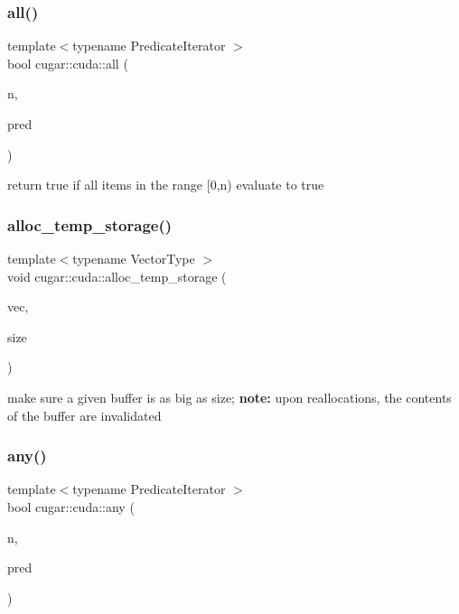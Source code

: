 \subsubsection{\texorpdfstring{all()}{all()}}
{\footnotesize\ttfamily template$<$typename Predicate\+Iterator $>$ \\
bool cugar\+::cuda\+::all (\begin{DoxyParamCaption}\item[{const uint32}]{n,  }\item[{const Predicate\+Iterator}]{pred }\end{DoxyParamCaption})}

return true if all items in the range \mbox{[}0,n) evaluate to true \mbox{\label{group___c_u_d_a_primitives_gafdf4fa3f9edffaa78aefde67918ff47a}} 
\subsubsection{\texorpdfstring{alloc\+\_\+temp\+\_\+storage()}{alloc\_temp\_storage()}}
{\footnotesize\ttfamily template$<$typename Vector\+Type $>$ \\
void cugar\+::cuda\+::alloc\+\_\+temp\+\_\+storage (\begin{DoxyParamCaption}\item[{Vector\+Type \&}]{vec,  }\item[{const uint64}]{size }\end{DoxyParamCaption})}

make sure a given buffer is as big as size; {\bfseries note\+:} upon reallocations, the contents of the buffer are invalidated \mbox{\label{group___c_u_d_a_primitives_ga398b5731f714f21b3161db7aaa34eda2}} 
\subsubsection{\texorpdfstring{any()}{any()}}
{\footnotesize\ttfamily template$<$typename Predicate\+Iterator $>$ \\
bool cugar\+::cuda\+::any (\begin{DoxyParamCaption}\item[{const uint32}]{n,  }\item[{const Predicate\+Iterator}]{pred }\end{DoxyParamCaption})}


